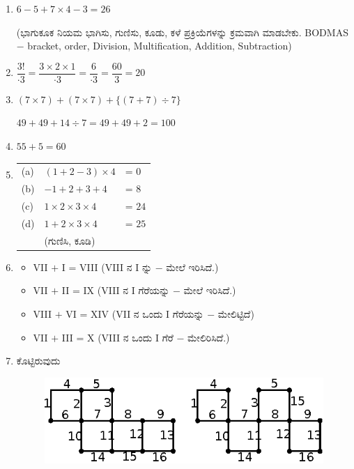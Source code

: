 \begin{enumerate}
\itemsep=5pt

\item $6 - 5 + 7 \times 4 - 3 = 26$

(ಭಾಗುಕೂಕ ನಿಯಮ ಭಾಗಿಸು, ಗುಣಿಸು, ಕೂಡು, ಕಳೆ ಪ್ರಕ್ರಿಯೆಗಳನ್ನು ಕ್ರಮವಾಗಿ ಮಾಡಬೇಕು. BODMAS $-$ bracket, order, Division, Multification, Addition, Subtraction)

\item $\dfrac{3!}{\cdot 3} = \dfrac{3\times 2\times 1}{\cdot 3} = \dfrac{6}{\cdot 3} = \dfrac{60}{3} = 20$

\vskip 0.3cm

\item $(7\times 7) + (7\times 7) + \{(7 + 7) \div 7\}$

\vskip 0.1cm

$49 + 49 + 14 \div 7 = 49 + 49 + 2 = 100$

\item  $55 + 5 = 60$

\item 
\begin{tabular}[t]{lll}
(a) & $(1 + 2 - 3)\times 4$ &  = $0$\\
(b) & $-1 + 2 + 3 + 4$ & = $8$\\
(c) & $1\times 2\times 3\times 4$ &  = $24$\\
(d) & $1 + 2\times 3\times 4$ &  = $25$\\
& (ಗುಣಿಸಿ, ಕೂಡಿ) & 
\end{tabular}

\vskip 0.3cm

\item 
\begin{itemize}
\item[(a)] VII $+$ I = VIII (VIII ನ I ನ್ನು $-$ ಮೇಲೆ ಇರಿಸಿದೆ.)
\item[(b)] VII $+$ II = IX (VIII ನ I ಗೆರೆಯನ್ನು $-$ ಮೇಲೆ ಇರಿಸಿದೆ.)
\item[(c)] VIII $+$ VI = XIV (VII ನ ಒಂದು I ಗೆರೆಯನ್ನು $-$ ಮೇಲಿಟ್ಟಿದೆ)
\item[(d)] VII $+$ III = X (VIII ನ ಒಂದು I ಗೆರೆ $-$ ಮೇಲಿರಿಸಿದೆ.)
\end{itemize}

\item ಕೊಟ್ಟಿರುವುದು 

\vskip -0.2cm

\begin{figure}[H]
\centering
\includegraphics{images/chap11/ans7.eps}


\end{figure}
\end{enumerate}

